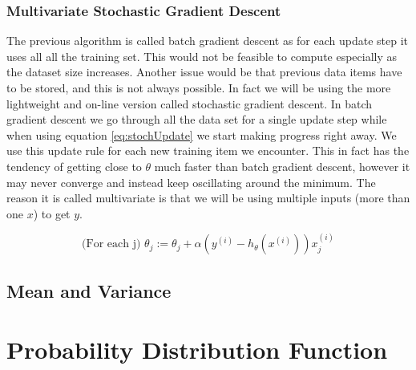 \documentclass{mproj}
\begin{document}
\subsubsection{Multivariate Stochastic Gradient Descent}
The previous algorithm is called batch gradient descent as for each update step it uses all all the training set. This would not be feasible to compute especially as the dataset size increases. Another issue would be that previous data items have to be stored, and this is not always possible. In fact we will be using the more lightweight and on-line version called stochastic gradient descent. In batch gradient descent we go through all the data set for a single update step while when using equation \ref{eq:stochUpdate} we start making progress right away. We use this update rule for each new training item we encounter. This in fact has the tendency of getting close to $\theta$ much faster than batch gradient descent, however it may never converge and instead keep oscillating around the minimum. The reason it is called multivariate is that we will be using multiple inputs (more than one $x$) to get $y$.

\begin{equation}
\label{eq:stochUpdate}
\text{(For each j) }\theta_j := \theta_j + \alpha(y^{(i)}-h_\theta(x^{(i)}))x_j^{(i)}
\end{equation}

\subsection{Mean and Variance}

\section{Probability Distribution Function}
\end{document}
